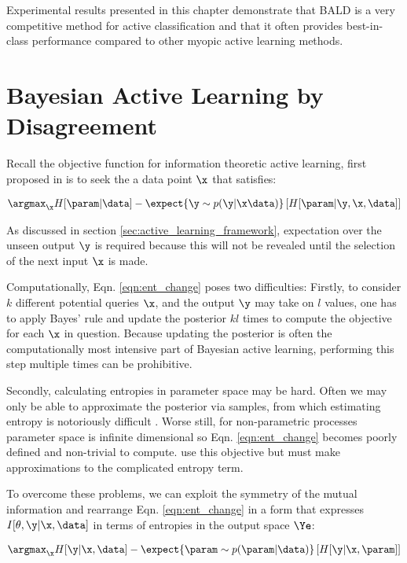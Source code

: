 Experimental results presented in this chapter demonstrate that BALD is a very competitive method for active classification and that it often provides best-in-class performance compared to other myopic active learning methods.

\section{Bayesian Active Learning by Disagreement}

Recall the objective function for information theoretic active learning, first proposed in \citep{lindley1956} is to seek the a data point $\x$ that satisfies:

\begin{align}	
	\label{eqn:ent_change}
	\argmax_{\x} H[\param | \data] - \expect{\y\sim p(\y|\x\data)} \left[ H[\param| \y, \x,\data] \right] 
\end{align}

As discussed in section \ref{sec:active_learning_framework}, expectation over the unseen output $\y$ is required because this will not be revealed until the selection of the next input $\x$ is made.

Computationally, Eqn. \eqref{eqn:ent_change} poses two difficulties: Firstly, to consider $k$ different potential queries $\x$, and the output $\y$ may take on $l$ values, one has to apply Bayes' rule and update the posterior $kl$ times to compute the objective for each $\x$ in question. Because updating the posterior is often the computationally most intensive part of Bayesian active learning, performing this step multiple times can be prohibitive.

Secondly, calculating entropies in parameter space may be hard. Often we may only be able to approximate the posterior via samples, from which estimating entropy is notoriously difficult \citep{panzeri2007}. Worse still, for non-parametric processes parameter space is infinite dimensional so Eqn. \eqref{eqn:ent_change} becomes poorly defined and non-trivial to compute. \citep{mackay1992, krishnapuram2004, lawrence2004} use this objective but must make approximations to the complicated entropy term.

To overcome these problems, we can exploit the symmetry of the mutual information and rearrange Eqn. \eqref{eqn:ent_change} in a form that expresses $I[\theta,\y\vert\x,\data]$ in terms of entropies in the output space $\Ye$:

\begin{align}
\argmax_{\x} H[\y \vert \x, \data] - \expect{\param\sim p(\param|\data)} \left[ H[\y \vert \x,\param] \right] \label{eqn:rearrangement} 
\end{align}

